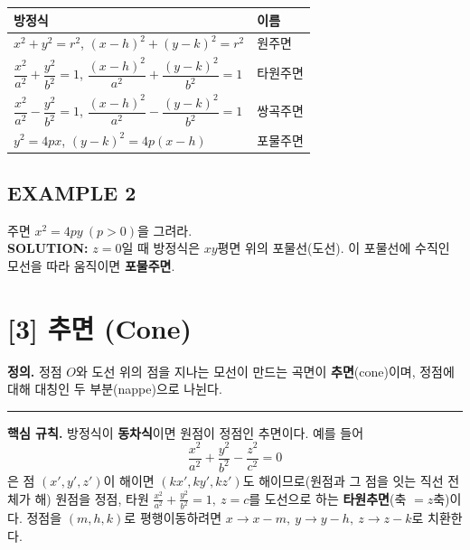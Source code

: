 \documentclass{article}
\theoremstyle{mystyle}
\begin{document}
\begin{center}
\renewcommand{\arraystretch}{1.4}
\begin{tabular}{|l|l|}
\hline
방정식 & 이름 \\
\hline
\(x^2+y^2=r^2\), \((x-h)^2+(y-k)^2=r^2\) & 원주면 \\
\hline
\(\dfrac{x^2}{a^2}+\dfrac{y^2}{b^2}=1\), \(\dfrac{(x-h)^2}{a^2}+\dfrac{(y-k)^2}{b^2}=1\) & 타원주면 \\
\hline
\(\dfrac{x^2}{a^2}-\dfrac{y^2}{b^2}=1\), \(\dfrac{(x-h)^2}{a^2}-\dfrac{(y-k)^2}{b^2}=1\) & 쌍곡주면 \\
\hline
\(y^2=4px\), \((y-k)^2=4p(x-h)\) & 포물주면 \\
\hline
\end{tabular}
\end{center}

\subsection*{EXAMPLE 2}
주면 \(x^2=4py\ (p>0)\)을 그려라.\\
\textbf{SOLUTION:} \(z=0\)일 때 방정식은 \(xy\)평면 위의 포물선(도선). 이 포물선에 수직인 모선을 따라 움직이면 \textbf{포물주면}.

\section*{[3] 추면 (Cone)}

\begin{tcolorbox}[
    colback=teal!4,
    colframe=teal!65!black,
    title=정의 \& 핵심 규칙,
    fonttitle=\bfseries,
    boxrule=0.5mm,
    arc=3mm
    ]
    \textbf{\textcolor{teal!65!black}{정의.}}\quad
    정점 \(O\)와 도선 위의 점을 지나는 모선이 만드는 곡면이 \textbf{추면}(cone)이며, 정점에 대해 대칭인 두 부분(nappe)으로 나뉜다.

    \noindent\textcolor{teal!50!black}{\rule{\linewidth}{0.4pt}}

    \textbf{\textcolor{teal!65!black}{핵심 규칙.}}\quad
    방정식이 \textbf{동차식}이면 원점이 정점인 추면이다. 예를 들어
    \[
    \frac{x^2}{a^2}+\frac{y^2}{b^2}-\frac{z^2}{c^2}=0
    \]
    은 점 \((x',y',z')\)이 해이면 \((kx',ky',kz')\)도 해이므로(원점과 그 점을 잇는 직선 전체가 해) 원점을 정점, 타원 \(\frac{x^2}{a^2}+\frac{y^2}{b^2}=1,\ z=c\)를 도선으로 하는 \textbf{타원추면}(축 \(=z\)축)이다. 정점을 \((m,h,k)\)로 평행이동하려면 \(x\to x-m,\ y\to y-h,\ z\to z-k\)로 치환한다.
\end{tcolorbox}
\end{document}
